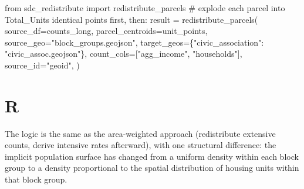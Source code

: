 \documentclass[
  letterpaper,
  DIV=11,
  numbers=noendperiod]{scrreprt}
\newenvironment{Shaded}{\begin{snugshade}}{\end{snugshade}}
\newcommand{\AttributeTok}[1]{\textcolor[rgb]{0.40,0.45,0.13}{#1}}
\newcommand{\CommentTok}[1]{\textcolor[rgb]{0.37,0.37,0.37}{#1}}
\newcommand{\FunctionTok}[1]{\textcolor[rgb]{0.28,0.35,0.67}{#1}}
\newcommand{\ImportTok}[1]{\textcolor[rgb]{0.00,0.46,0.62}{#1}}
\newcommand{\NormalTok}[1]{\textcolor[rgb]{0.00,0.23,0.31}{#1}}
\newcommand{\OperatorTok}[1]{\textcolor[rgb]{0.37,0.37,0.37}{#1}}
\newcommand{\OtherTok}[1]{\textcolor[rgb]{0.00,0.23,0.31}{#1}}
\newcommand{\SpecialCharTok}[1]{\textcolor[rgb]{0.37,0.37,0.37}{#1}}
\newcommand{\StringTok}[1]{\textcolor[rgb]{0.13,0.47,0.30}{#1}}
\begin{document}
\begin{Shaded}
\begin{Highlighting}[]
\ImportTok{from}\NormalTok{ sdc\_redistribute }\ImportTok{import}\NormalTok{ redistribute\_parcels}
\CommentTok{\# explode each parcel into Total\_Units identical points first, then:}
\NormalTok{result }\OperatorTok{=}\NormalTok{ redistribute\_parcels(}
\NormalTok{    source\_df}\OperatorTok{=}\NormalTok{counts\_long, parcel\_centroids}\OperatorTok{=}\NormalTok{unit\_points,}
\NormalTok{    source\_geo}\OperatorTok{=}\StringTok{"block\_groups.geojson"}\NormalTok{,}
\NormalTok{    target\_geos}\OperatorTok{=}\NormalTok{\{}\StringTok{"civic\_association"}\NormalTok{: }\StringTok{"civic\_assoc.geojson"}\NormalTok{\},}
\NormalTok{    count\_cols}\OperatorTok{=}\NormalTok{[}\StringTok{"agg\_income"}\NormalTok{, }\StringTok{"households"}\NormalTok{], source\_id}\OperatorTok{=}\StringTok{"geoid"}\NormalTok{,}
\NormalTok{)}
\end{Highlighting}
\end{Shaded}

\section{R}

\begin{Shaded}
\end{Shaded}

The logic is the same as the area-weighted approach (redistribute
extensive counts, derive intensive rates afterward), with one structural
difference: the implicit population surface has changed from a uniform
density within each block group to a density proportional to the spatial
distribution of housing units within that block group.
\end{document}
